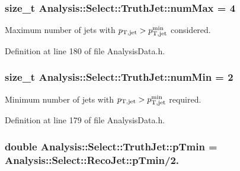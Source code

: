 \subsubsection[{\texorpdfstring{num\+Max}{numMax}}]{\setlength{\rightskip}{0pt plus 5cm}size\+\_\+t Analysis\+::\+Select\+::\+Truth\+Jet\+::num\+Max = 4\hspace{0.3cm}{\ttfamily [static]}}\hypertarget{namespaceAnalysis_1_1Select_1_1TruthJet_a3e73a3d49de39243c85530cbc79563b6}{}\label{namespaceAnalysis_1_1Select_1_1TruthJet_a3e73a3d49de39243c85530cbc79563b6}


Maximum number of jets with $ p_{\rm T,jet} > p_{\rm T,jet}^{\rm min} $ considered. 



Definition at line 180 of file Analysis\+Data.\+h.

\subsubsection[{\texorpdfstring{num\+Min}{numMin}}]{\setlength{\rightskip}{0pt plus 5cm}size\+\_\+t Analysis\+::\+Select\+::\+Truth\+Jet\+::num\+Min = 2\hspace{0.3cm}{\ttfamily [static]}}\hypertarget{namespaceAnalysis_1_1Select_1_1TruthJet_aa181b8b794140e329394a3a941e18138}{}\label{namespaceAnalysis_1_1Select_1_1TruthJet_aa181b8b794140e329394a3a941e18138}


Minimum number of jets with $ p_{\rm T,jet} > p_{\rm T,jet}^{\rm min} $ required. 



Definition at line 179 of file Analysis\+Data.\+h.

\subsubsection[{\texorpdfstring{p\+Tmin}{pTmin}}]{\setlength{\rightskip}{0pt plus 5cm}double Analysis\+::\+Select\+::\+Truth\+Jet\+::p\+Tmin = Analysis\+::\+Select\+::\+Reco\+Jet\+::p\+Tmin/2.\hspace{0.3cm}{\ttfamily [static]}}\hypertarget{namespaceAnalysis_1_1Select_1_1TruthJet_a861b3fa8b899e322a5f8a8d04a707220}{}\label{namespaceAnalysis_1_1Select_1_1TruthJet_a861b3fa8b899e322a5f8a8d04a707220}


